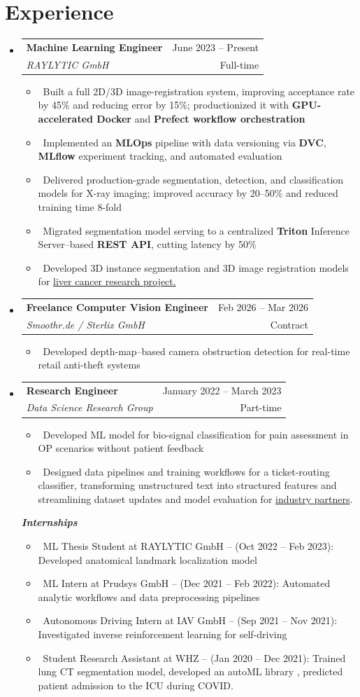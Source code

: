 \documentclass[letterpaper,10pt]{article}
\makeatletter
\newcommand{\resumeItem}[1]{
    \item\small{#1}\vspace{-0.5pt}
}
\newcommand{\resumeSubheading}[4]{
\vspace{2pt}\item
  \begin{tabular*}{0.97\textwidth}[t]{l@{\extracolsep{\fill}}r}
    \textbf{#1} & #2 \\
    \textit{{#3}} & {#4} \\
  \end{tabular*}\vspace{-0pt}
}
\newcommand{\resumeSubHeadingList}{\begin{itemize}[leftmargin=0.15in, label={}]\vspace{-2pt}}
\newcommand{\resumeSubHeadingListEnd}{\end{itemize}}
\makeatother
\begin{document}
\section{Experience}
\resumeSubHeadingList
  \resumeSubheading
      {Machine Learning Engineer}{June 2023 -- Present}
      {RAYLYTIC GmbH}{Full-time}
      \resumeSubHeadingList
          \resumeItem{\textbullet\ Built a full 2D/3D image-registration system, improving acceptance rate by 45\% and reducing error by 15\%; productionized it with \textbf{GPU-accelerated Docker} and \textbf{Prefect workflow orchestration}}
          \resumeItem{\textbullet\ Implemented an \textbf{MLOps} pipeline with data versioning via \textbf{DVC}, \textbf{MLflow} experiment tracking, and automated evaluation}
          \resumeItem{\textbullet\ Delivered production-grade segmentation, detection, and classification models for X-ray imaging; improved accuracy by 20--50\% and reduced training time 8-fold}
          \resumeItem{\textbullet\ Migrated segmentation model serving to a centralized \textbf{Triton} Inference Server--based \textbf{REST API}, cutting latency by 50\%}
          \resumeItem{\textbullet\ Developed 3D instance segmentation and 3D image registration models for \href{https://www.photonikforschung.de/projekte/lebenswissenschaften/projekt/photiomics.html}{liver cancer research project.}}
      \resumeSubHeadingListEnd
  
  \resumeSubheading
      {Freelance Computer Vision Engineer}{Feb 2026 -- Mar 2026}
      {Smoothr.de / Sterlix GmbH}{Contract}
      \resumeSubHeadingList
          \resumeItem{\textbullet\ Developed depth-map--based camera obstruction detection for real-time retail anti-theft systems}
      \resumeSubHeadingListEnd
      
  \resumeSubheading
      {Research Engineer}{January 2022 -- March 2023}
      {Data Science Research Group}{Part-time}
      \resumeSubHeadingList
          \resumeItem{\textbullet\ Developed ML model for bio-signal classification for pain assessment in OP scenarios without patient feedback}
          \resumeItem{\textbullet\ Designed data pipelines and training workflows for a ticket-routing classifier, transforming unstructured text into structured features and streamlining dataset updates and model evaluation for \href{https://infai.org/projekt-kmi/}{industry partners}.}
      \resumeSubHeadingListEnd

  \vspace{2pt}
  \textit{\textbf{Internships}}
  \resumeSubHeadingList
      \resumeItem{\textbullet\ {ML Thesis Student at RAYLYTIC GmbH} -- (Oct 2022 -- Feb 2023): Developed anatomical landmark localization model}
      \resumeItem{\textbullet\ {ML Intern at Prudsys GmbH} -- (Dec 2021 -- Feb 2022): Automated analytic workflows and data preprocessing pipelines}
      \resumeItem{\textbullet\ {Autonomous Driving Intern at IAV GmbH} -- (Sep 2021 -- Nov 2021): Investigated inverse {reinforcement learning} for self-driving}
      \resumeItem{\textbullet\ {Student Research Assistant at WHZ} -- (Jan 2020 -- Dec 2021): Trained lung CT segmentation model, developed an {autoML} library}, predicted patient admission to the ICU during COVID.
  \resumeSubHeadingListEnd
\resumeSubHeadingListEnd
\end{document}
